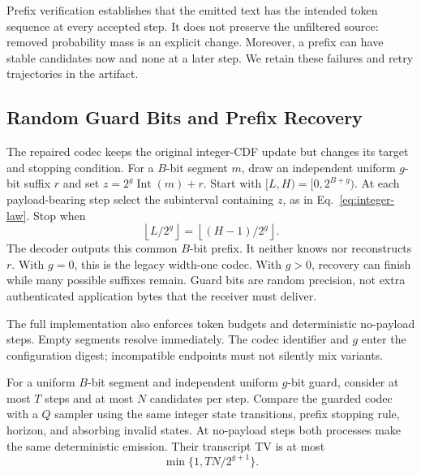 Prefix verification establishes that the emitted text has the intended token
sequence at every accepted step. It does not preserve the unfiltered source:
removed probability mass is an explicit change. Moreover, a prefix can have
stable candidates now and none at a later step. We retain these failures and
retry trajectories in the artifact.

\subsection{Random Guard Bits and Prefix Recovery}

The repaired codec keeps the original integer-CDF update but changes its target
and stopping condition. For a $B$-bit segment $m$, draw an independent uniform
$g$-bit suffix $r$ and set $z=2^g\operatorname{Int}(m)+r$. Start with
$[L,H)=[0,2^{B+g})$. At each payload-bearing step select the subinterval
containing $z$, as in Eq.~\eqref{eq:integer-law}. Stop when
\begin{equation}
 \left\lfloor L/2^g\right\rfloor
 =\left\lfloor(H-1)/2^g\right\rfloor.
 \label{eq:guard-stop}
\end{equation}
The decoder outputs this common $B$-bit prefix. It neither knows nor reconstructs
$r$. With $g=0$, this is the legacy width-one codec. With $g>0$, recovery can
finish while many possible suffixes remain. Guard bits are random precision,
not extra authenticated application bytes that the receiver must deliver.

The full implementation also enforces token budgets and deterministic no-payload
steps. Empty segments resolve immediately. The codec identifier and $g$ enter
the configuration digest; incompatible endpoints must not silently mix variants.

\begin{theorem}
\label{thm:guard}
For a uniform $B$-bit segment and independent uniform $g$-bit guard, consider at
most $T$ steps and at most $N$ candidates per step. Compare the guarded codec
with a $Q$ sampler using the same integer state transitions, prefix stopping
rule, horizon, and absorbing invalid states. At no-payload steps both processes
make the same deterministic emission.
Their transcript TV is at most
\begin{equation}
 \min\{1,TN/2^{g+1}\}.
 \label{eq:guard-bound}
\end{equation}
\end{theorem}

